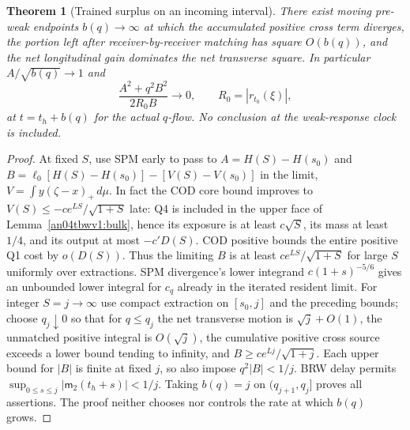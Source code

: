 \documentclass[11pt]{article}
\newtheorem{theorem}{Theorem}\newtheorem{lemma}{Lemma}
\newcommand{\dd}{\,d}\newcommand{\E}{\mathbb E}
\begin{document}
\begin{theorem}[Trained surplus on an incoming interval]\label{an04tbwv1:surplus}
There exist moving pre-weak endpoints $b(q)\to\infty$ at which
the accumulated positive cross term diverges, the portion left
after receiver-by-receiver matching has square $O(b(q))$, and
the net longitudinal gain dominates the net transverse square.
In particular $A/\sqrt{b(q)}\to1$ and
\[
 \frac{A^2+q^2B^2}{2R_0B}\longrightarrow0,\qquad
 R_0=|r_{t_0}(\xi)|,
\]
at $t=t_h+b(q)$ for the actual $q$-flow. No conclusion at the
weak-response clock is included.
\end{theorem}
\begin{proof}
At fixed $S$, use SPM early to pass to
$A=H(S)-H(s_0)$ and
$B=\ell_0[H(S)-H(s_0)]-[V(S)-V(s_0)]$ in the limit,
$V=\int y(\zeta-x)_+\dd\mu$. In fact the COD core bound improves
to $V(S)\le-c e^{LS}/\sqrt{1+S}$ late: Q4 is included in the
upper face of Lemma~\ref{an04tbwv1:bulk}, hence its exposure is
at least $c\sqrt S$, its mass at least $1/4$, and its output at
most $-c'D(S)$. COD positive bounds the entire positive Q1 cost
by $o(D(S))$. Thus the limiting $B$ is at least
$c e^{LS}/\sqrt{1+S}$ for large $S$ uniformly over extractions.
SPM divergence's lower integrand $c(1+s)^{-5/6}$ gives an
unbounded lower integral for $c_q$ already in the iterated
resident limit. For integer $S=j\to\infty$ use compact extraction
on $[s_0,j]$ and the preceding bounds; choose $q_j\downarrow0$
so that for $q\le q_j$ the net transverse motion is
$\sqrt j+O(1)$, the unmatched positive integral is $O(\sqrt j)$,
the cumulative positive cross source exceeds a lower bound tending
to infinity, and $B\ge c e^{Lj}/\sqrt{1+j}$. Each upper bound
for $|B|$ is finite at fixed $j$, so also impose $q^2|B|<1/j$.
BRW delay permits $\sup_{0\le s\le j}|\mathsf m_2(t_h+s)|<1/j$.
Taking $b(q)=j$ on $(q_{j+1},q_j]$ proves all assertions. The
proof neither chooses nor controls the rate at which $b(q)$ grows.
\end{proof}
\end{document}
